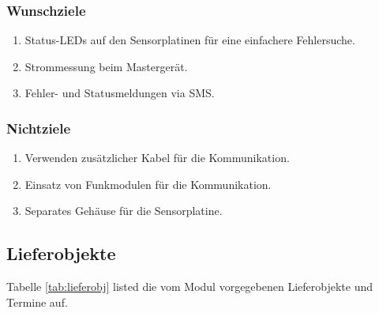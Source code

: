 \subsubsection{Wunschziele}

\begin{enumerate}
    \item
        Status-LEDs auf den Sensorplatinen f\"ur eine einfachere Fehlersuche.
    \item
        Strommessung beim Masterger\"at.
    \item
        Fehler- und Statusmeldungen via SMS.
\end{enumerate}


\subsubsection{Nichtziele}

\begin{enumerate}
    \item
        Verwenden zus\"atzlicher Kabel f\"ur die Kommunikation.
    \item
        Einsatz von Funkmodulen f\"ur die Kommunikation.
    \item
        Separates Geh\"ause f\"ur die Sensorplatine.
\end{enumerate}

\subsection{Lieferobjekte}

Tabelle \ref{tab:lieferobj}  listed die  vom Modul  vorgegebenen Lieferobjekte
und Termine auf.

